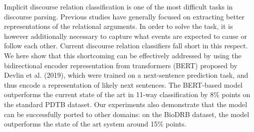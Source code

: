 Implicit discourse relation classification is one of the most difficult tasks in discourse parsing. Previous studies have generally focused on extracting better representations of the relational arguments. In order to solve the task, it is however additionally necessary to capture what events are expected to cause or follow each other. Current discourse relation classifiers fall short in this respect. We here show that this shortcoming can be effectively addressed by using the bidirectional encoder representation from transformers (BERT) proposed by Devlin et al. (2019), which were trained on a next-sentence prediction task, and thus encode a representation of likely next sentences. The BERT-based model outperforms the current state of the art in 11-way classification by 8\% points on the standard PDTB dataset. Our experiments also demonstrate that the model can be successfully ported to other domains: on the BioDRB dataset, the model outperforms the state of the art system around 15\% points.